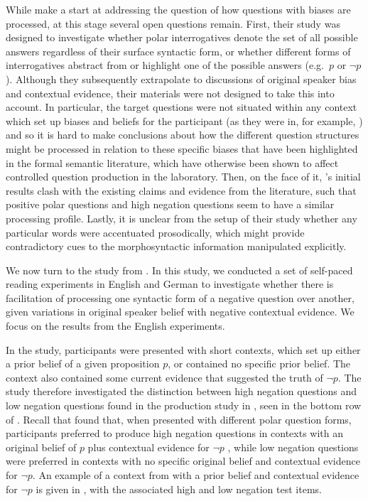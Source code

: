 \documentclass[output=paper,colorlinks,citecolor=brown]{langscibook}
\begin{document}
While \citet{tian_representing_2021} make a start at addressing the question of how questions with biases are processed, at this stage several open questions remain. First, their study was designed to investigate whether polar interrogatives denote the set of all possible answers \citep{hamblin_questions_1973, karttunen_syntax_1977, groenendijk_studies_1984} regardless of their surface syntactic form, or whether different forms of interrogatives abstract from \citep{ginzburg_interrogative_2001} or highlight \citep{roelofsen_polarity_2015} one of the possible answers (e.g.\ $p$ or $\neg p$). Although they subsequently extrapolate to discussions of original speaker bias and contextual evidence, their materials were not designed to take this into account. In particular, the target questions were not situated within any context which set up biases and beliefs for the participant (as they were in, for example, \citealt{domaneschi_bias_2017}) and so it is hard to make conclusions about how the different question structures might be processed in relation to these specific biases that have been highlighted in the formal semantic literature, which have otherwise been shown to affect controlled question production in the laboratory. Then, on the face of it, \citeauthor{tian_representing_2021}'s initial results clash with the existing claims and evidence from the literature, such that positive polar questions and high negation questions seem to have a similar processing profile. Lastly, it is unclear from the setup of their study whether any particular words were accentuated prosodically, which might provide contradictory cues to the morphosyntactic information manipulated explicitly. 

We now turn to the study from \citet{macuch_processing_inprep}. In this study, we conducted a set of self-paced reading experiments in English and German to investigate whether there is facilitation of processing one syntactic form of a negative question over another, given variations in original speaker belief with negative contextual evidence. We focus on the results from the English experiments.

In the study, participants were presented with short contexts, which set up either a prior belief of a given proposition $p$, or contained no specific prior belief. The context also contained some current evidence that suggested the truth of $\neg p$. The study therefore investigated the distinction between high negation questions and low negation questions found in the production study in \citet{domaneschi_bias_2017}, seen in the bottom row of . Recall that \citet{domaneschi_bias_2017} found that, when presented with different polar question forms, participants preferred to produce high negation questions in contexts with an original belief of $p$ plus contextual evidence for $\neg p$ , while low negation questions were preferred in contexts with no specific original belief and contextual evidence for $\neg p$. An example of a context from \citet{macuch_processing_inprep} with a prior belief and contextual evidence for $\neg p$ is given in , with the associated high and low negation test items.
\end{document}
